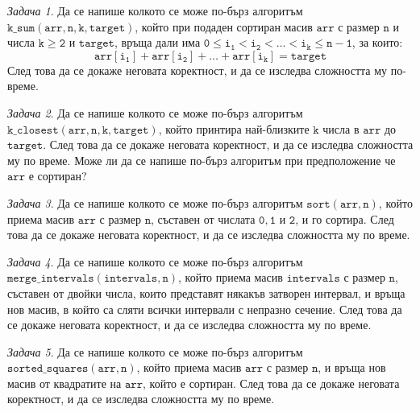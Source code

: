 \documentclass{article}
\theoremstyle{definition}
\theoremstyle{plain}
\theoremstyle{remark}
\newtheorem{problem}{Задача}
\theoremstyle{definition}
\begin{document}
\begin{problem}
Да се напише колкото се може по-бърз алгоритъм $\mathtt{k\_sum(arr, n, k, target)}$, който при подаден сортиран масив $\mathtt{arr}$ с размер $\mathtt{n}$ и числа $\mathtt{k \geq 2}$ и $\mathtt{target}$, връща дали има $\mathtt{0 \leq i_1 < i_2 < \dots < i_k \leq n - 1}$, за които:
\[
    \mathtt{arr[i_1] + arr[i_2] + \dots + arr[i_k] = target}
\]
След това да се докаже неговата коректност, и да се изследва сложността му по-време.
\end{problem}

\begin{problem}
Да се напише колкото се може по-бърз алгоритъм $\mathtt{k\_closest(arr, n, k, target)}$, който принтира най-близките $\mathtt{k}$ числа в $\mathtt{arr}$ до $\mathtt{target}$.
След това да се докаже неговата коректност, и да се изследва сложността му по време.
Може ли да се напише по-бърз алгоритъм при предположение че $\mathtt{arr}$ е сортиран?
\end{problem}

\begin{problem}
Да се напише колкото се може по-бърз алгоритъм $\mathtt{sort(arr, n)}$, който приема масив $\mathtt{arr}$ с размер $\mathtt{n}$, съставен от числата $\mathtt{0, 1}$ и $\mathtt{2}$, и го сортира.
След това да се докаже неговата коректност, и да се изследва сложността му по време.
\end{problem}

\begin{problem}
Да се напише колкото се може по-бърз алгоритъм $\mathtt{merge\_intervals(intervals, n)}$, който приема масив $\mathtt{intervals}$ с размер $\mathtt{n}$, съставен от двойки числа, които представят някакъв затворен интервал, и връща нов масив, в който са сляти всички интервали с непразно сечение.
След това да се докаже неговата коректност, и да се изследва сложността му по време.
\end{problem}

\begin{problem}
Да се напише колкото се може по-бърз алгоритъм $\mathtt{sorted\_squares(arr, n)}$, който приема масив $\mathtt{arr}$ с размер $\mathtt{n}$, и връща нов масив от квадратите на $\mathtt{arr}$, който е сортиран.
След това да се докаже неговата коректност, и да се изследва сложността му по време.
\end{problem}
\end{document}
